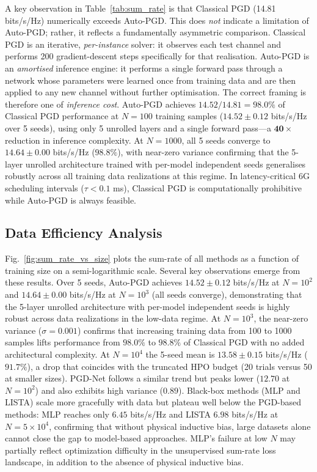\documentclass[conference,11pt]{IEEEtran}
\begin{document}
A key observation in Table~\ref{tab:sum_rate} is that Classical PGD (14.81 bits/s/Hz) numerically exceeds Auto-PGD. This does \emph{not} indicate a limitation of Auto-PGD; rather, it reflects a fundamentally asymmetric comparison.
Classical PGD is an iterative, \emph{per-instance} solver: it observes each test channel and performs 200 gradient-descent steps specifically for that realisation.
Auto-PGD is an \emph{amortised} inference engine: it performs a single forward pass through a network whose parameters were learned once from training data and are then applied to any new channel without further optimisation.
The correct framing is therefore one of \emph{inference cost}.
Auto-PGD achieves $14.52 / 14.81 = 98.0\%$ of Classical PGD performance at $N{=}100$ training samples ($14.52{\pm}0.12$ bits/s/Hz over 5 seeds), using only 5 unrolled layers and a single forward pass—a $\mathbf{40{\times}}$ reduction in inference complexity.
At $N{=}1000$, all 5 seeds converge to $14.64{\pm}0.00$ bits/s/Hz ($98.8\%$), with near-zero variance confirming that the 5-layer unrolled architecture trained with per-model independent seeds generalises robustly across all training data realizations at this regime.
In latency-critical 6G scheduling intervals ($\tau < 0.1$ ms), Classical PGD is computationally prohibitive while Auto-PGD is always feasible.

\subsection{Data Efficiency Analysis}
Fig.~\ref{fig:sum_rate_vs_size} plots the sum-rate of all methods as a function of training size on a semi-logarithmic scale. Several key observations emerge from these results. Over 5 seeds, Auto-PGD achieves $14.52{\pm}0.12$ bits/s/Hz at $N=10^2$ and $14.64{\pm}0.00$ bits/s/Hz at $N=10^3$ (all seeds converge), demonstrating that the 5-layer unrolled architecture with per-model independent seeds is highly robust across data realizations in the low-data regime. At $N=10^3$, the near-zero variance ($\sigma{=}0.001$) confirms that increasing training data from 100 to 1000 samples lifts performance from $98.0\%$ to $98.8\%$ of Classical PGD with no added architectural complexity. At $N=10^4$ the 5-seed mean is $13.58{\pm}0.15$ bits/s/Hz ($91.7\%$), a drop that coincides with the truncated HPO budget (20 trials versus 50 at smaller sizes). PGD-Net follows a similar trend but peaks lower ($12.70$ at $N=10^2$) and also exhibits high variance ($0.89$). Black-box methods (MLP and LISTA) scale more gracefully with data but plateau well below the PGD-based methods: MLP reaches only $6.45$ bits/s/Hz and LISTA $6.98$ bits/s/Hz at $N=5\!\times\!10^4$, confirming that without physical inductive bias, large datasets alone cannot close the gap to model-based approaches. MLP's failure at low $N$ may partially reflect optimization difficulty in the unsupervised sum-rate loss landscape, in addition to the absence of physical inductive bias.
\end{document}

